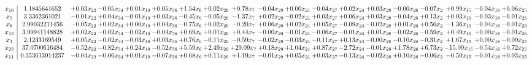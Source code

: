 \documentclass[9pt]{article}
\begin{document}
 \[\begin{array}{c| c c@{\hskip 2pt} c@{\hskip 2pt} c@{\hskip 2pt} c@{\hskip 2pt} c@{\hskip 2pt} c@{\hskip 2pt} c@{\hskip 2pt} c@{\hskip 2pt} c@{\hskip 2pt} c@{\hskip 2pt} c@{\hskip 2pt} c@{\hskip 2pt} c@{\hskip 2pt} c@{\hskip 2pt} c@{\hskip 2pt} c@{\hskip 2pt} c@{\hskip 2pt} }
 x_{16}   &  1.1845641652 & +  0.03 x_{22} & -0.05 x_{34} & +  0.01 x_{19} & +  0.05 x_{36} & +  1.54 x_{6} & +  0.02 x_{20} & +  0.78 x_{7} & -0.04 x_{29} & +  0.00 x_{21} & -0.04 x_{27} & +  0.02 x_{24} & +  0.03 x_{28} & -0.00 x_{26} & -0.07 x_{2} & +  0.99 x_{15} & -0.04 x_{18} & +  0.06 x_{25}\\
 x_{5}   &  3.3362361021 & -0.01 x_{22} & +  0.04 x_{34} & -0.01 x_{19} & +  0.03 x_{36} & -0.45 x_{6} & -0.05 x_{20} & -1.37 x_{7} & +  0.02 x_{29} & -0.02 x_{21} & +  0.03 x_{27} & +  0.06 x_{24} & +  0.03 x_{28} & -0.04 x_{26} & +  0.13 x_{2} & +  0.03 x_{15} & -0.03 x_{18} & -0.01 x_{25}\\
 x_{8}   &  2.99032211456 & -0.05 x_{22} & +  0.02 x_{34} & +  0.00 x_{19} & +  0.04 x_{36} & -0.75 x_{6} & +  0.02 x_{20} & -0.20 x_{7} & +  0.06 x_{29} & +  0.02 x_{21} & +  0.05 x_{27} & -0.09 x_{24} & -0.02 x_{28} & +  0.01 x_{26} & +  0.56 x_{2} & -1.36 x_{15} & -0.04 x_{18} & -0.01 x_{25}\\
 x_{13}   &  3.99941148828 & +  0.02 x_{22} & -0.02 x_{34} & -0.02 x_{19} & -0.04 x_{36} & +  0.69 x_{6} & +  0.01 x_{20} & +  0.44 x_{7} & -0.00 x_{29} & -0.01 x_{21} & -0.06 x_{27} & -0.01 x_{24} & +  0.01 x_{28} & -0.02 x_{26} & -0.59 x_{2} & +  0.49 x_{15} & +  0.00 x_{18} & -0.01 x_{25}\\
 x_{4}   &  2.1233169549 & +  0.05 x_{22} & -0.02 x_{34} & -0.03 x_{19} & +  0.03 x_{36} & +  0.76 x_{6} & -0.11 x_{20} & -0.59 x_{7} & -0.02 x_{29} & -0.03 x_{21} & -0.11 x_{27} & +  0.13 x_{24} & -0.00 x_{28} & -0.10 x_{26} & -0.31 x_{2} & +  1.67 x_{15} & +  0.00 x_{18} & -0.00 x_{25}\\
 x_{23}   &  37.0700616484 & -0.52 x_{22} & -0.82 x_{34} & +  0.24 x_{19} & -0.52 x_{36} & +  5.59 x_{6} & +  2.49 x_{20} & + 29.09 x_{7} & +  0.18 x_{29} & +  1.04 x_{21} & +  0.87 x_{27} & -2.72 x_{24} & -0.01 x_{28} & +  1.78 x_{26} & +  6.73 x_{2} & -15.09 x_{15} & -0.54 x_{18} & +  0.72 x_{25}\\
 x_{11}   &  0.353613914237 & -0.04 x_{22} & -0.06 x_{34} & +  0.01 x_{19} & -0.07 x_{36} & +  0.68 x_{6} & +  0.11 x_{20} & +  1.19 x_{7} & -0.01 x_{29} & +  0.05 x_{21} & +  0.03 x_{27} & -0.13 x_{24} & -0.02 x_{28} & +  0.10 x_{26} & -0.06 x_{2} & -0.50 x_{15} & -0.01 x_{18} & +  0.03 x_{25}\\

\end{array}\]
\end{document}
